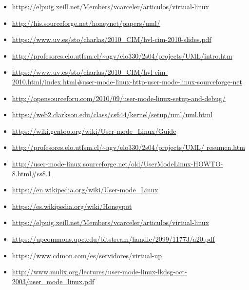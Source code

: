 \documentclass[11pt,twoside,titlepage,a4paper]{article}
\theoremstyle{definition}
\theoremstyle{plain_rojo}
\theoremstyle{remark}
\begin{document}
\begin{itemize}[font={\color{rojooscuro}\bfseries},noitemsep,align=left]
\sloppy
\item \url{https://elpuig.xeill.net/Members/vcarceler/articulos/virtual-linux}
\item \url{http://his.sourceforge.net/honeynet/papers/uml/}
\item \url{https://www.uv.es/sto/charlas/2010_CIM/hvl-cim-2010-slides.pdf}
\item \url{http://profesores.elo.utfsm.cl/~agv/elo330/2s04/projects/UML/intro.htm}
\item \url{https://www.uv.es/sto/charlas/2010_CIM/hvl-cim-2010.html/index.html#user-mode-linux-http-user-mode-linux-sourceforge-net}
\item \url{http://opensourceforu.com/2010/09/user-mode-linux-setup-and-debug/}
\item \url{https://web2.clarkson.edu/class/cs644/kernel/setup/uml/uml.html}
\item \url{https://wiki.gentoo.org/wiki/User-mode_Linux/Guide}
\item \url{http://profesores.elo.utfsm.cl/~agv/elo330/2s04/projects/UML/
resumen.htm}
\item \url{http://user-mode-linux.sourceforge.net/old/UserModeLinux-HOWTO-8.html#ss8.1}
\item \url{https://en.wikipedia.org/wiki/User-mode_Linux}
\item \url{https://es.wikipedia.org/wiki/Honeypot}
\item \url{https://elpuig.xeill.net/Members/vcarceler/articulos/virtual-linux}
\item \url{https://upcommons.upc.edu/bitstream/handle/2099/11773/a20.pdf}
\item \url{https://www.cdmon.com/es/servidores/virtual-up}
\item \url{http://www.mulix.org/lectures/user-mode-linux-lkdsg-oct-2003/user_mode_linux.pdf}
\end{itemize}
\end{document}
